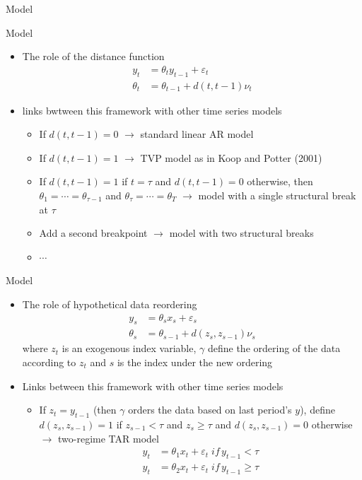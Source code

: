 \documentclass[dvipsnames,mathserif]{beamer}
\begin{document}
{\begin{frame}{Model}
\end{frame}
\begin{frame}{Model}
    \begin{itemize}
        \item The role of the distance function
            \begin{align}
            y_t &= \theta_ty_{t-1} + \varepsilon_t\\
            \theta_t &= \theta_{t-1} + d(t,t-1)\nu_t
            \end{align}
        \item links bwtween this framework with other time series models\\
        \begin{itemize}
            \item If $d(t,t-1) = 0$ $\rightarrow$ standard linear AR model
            \item If $d(t,t-1) = 1$ $\rightarrow$ TVP model as in Koop and Potter (2001)
            \item If $d(t,t-1) = 1$ if $t=\tau$ and $d(t,t-1) = 0$ otherwise, then $\theta_1 = \cdots = \theta_{\tau-1}$ and $\theta_{\tau} = \cdots = \theta_T$ $\rightarrow$ model with a single structural break at $\tau$
            \item Add a second breakpoint $\rightarrow$ model with two structural breaks
            \item $\cdots$ 
        \end{itemize}
    \end{itemize}
\end{frame}
\begin{frame}{Model}
    \begin{itemize}
        \item The role of hypothetical data reordering
            \begin{align}
                y_s &= \theta_sx_s + \varepsilon_s\\
                \theta_s &= \theta_{s-1} +  d(z_s, z_{s-1})\nu_s
                \end{align}
                where $z_t$ is an exogenous index variable, $\gamma$ define the ordering of the data according to $z_t$ and $s$ is the index under the new ordering
        \item Links between this framework with other time series models
        \begin{itemize}
            \item If $z_t = y_{t-1}$ (then $\gamma$ orders the data based on last period's $y$), define $d(z_s,z_{s-1}) = 1$ if $z_{s-1} < \tau$ and $z_s \geq \tau $ and $d(z_s,z_{s-1}) = 0$ otherwise $\rightarrow$ two-regime TAR model
                \begin{align*}
                y_t &= \theta_1x_t + \varepsilon_t \; if\,y_{t-1} <\tau\\
                y_t &= \theta_2x_t + \varepsilon_t \; if\,y_{t-1} \geq\tau
                \end{align*}
        \end{itemize}
    \end{itemize}
\end{frame}

}
\end{document}
